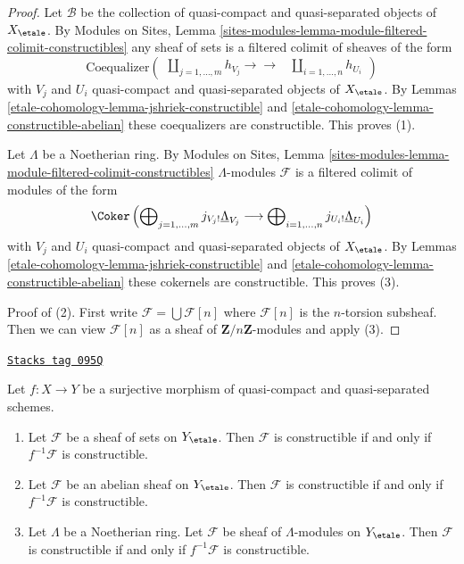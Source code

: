 \begin{proof}
Let $\mathcal{B}$ be the collection of quasi-compact and quasi-separated
objects of $X_\etale$. By Modules on Sites,
Lemma \ref{sites-modules-lemma-module-filtered-colimit-constructibles}
any sheaf of sets is a filtered colimit of sheaves of the form
$$
\text{Coequalizer}\left(
\begin{array}{cc}\coprod\nolimits_{j = 1, \ldots, m} h_{V_j}
\longrightarrow\longrightarrow & \coprod\nolimits_{i = 1, \ldots, n} h_{U_i}\end{array}
\right)
$$
with $V_j$ and $U_i$ quasi-compact and quasi-separated objects
of $X_\etale$. By
Lemmas \ref{etale-cohomology-lemma-jshriek-constructible} and \ref{etale-cohomology-lemma-constructible-abelian}
these coequalizers are constructible. This proves (1).

\medskip\noindent
Let $\Lambda$ be a Noetherian ring.
By Modules on Sites,
Lemma \ref{sites-modules-lemma-module-filtered-colimit-constructibles}
$\Lambda$-modules $\mathcal{F}$ is a filtered colimit
of modules of the form
$$
\Coker\left(
\bigoplus\nolimits_{j = 1, \ldots, m} j_{V_j!}\underline{\Lambda}_{V_j}
\longrightarrow
\bigoplus\nolimits_{i = 1, \ldots, n} j_{U_i!}\underline{\Lambda}_{U_i}
\right)
$$
with $V_j$ and $U_i$ quasi-compact and quasi-separated objects
of $X_\etale$. By
Lemmas \ref{etale-cohomology-lemma-jshriek-constructible} and \ref{etale-cohomology-lemma-constructible-abelian}
these cokernels are constructible. This proves (3).

\medskip\noindent
Proof of (2). First write $\mathcal{F} = \bigcup \mathcal{F}[n]$ where
$\mathcal{F}[n]$ is the $n$-torsion subsheaf. Then we can view
$\mathcal{F}[n]$ as a sheaf of $\mathbf{Z}/n\mathbf{Z}$-modules
and apply (3).
\end{proof}

\begin{lemma}
\label{etale-cohomology-lemma-check-constructible}
\href{https://stacks.math.columbia.edu/tag/095Q}{\texttt{Stacks tag 095Q}}

Let $f : X \to Y$ be a surjective morphism of quasi-compact and
quasi-separated schemes.
\begin{enumerate}
\item Let $\mathcal{F}$ be a sheaf of sets on $Y_\etale$. Then $\mathcal{F}$
is constructible if and only if $f^{-1}\mathcal{F}$ is constructible.
\item Let $\mathcal{F}$ be an abelian sheaf on $Y_\etale$. Then $\mathcal{F}$
is constructible if and only if $f^{-1}\mathcal{F}$ is constructible.
\item Let $\Lambda$ be a Noetherian ring.
Let $\mathcal{F}$ be sheaf of $\Lambda$-modules on $Y_\etale$.
Then $\mathcal{F}$ is constructible if and only if $f^{-1}\mathcal{F}$
is constructible.
\end{enumerate}
\end{lemma}

